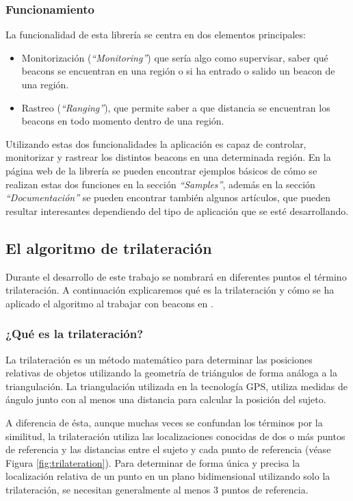 \subsubsection{Funcionamiento}

La funcionalidad de esta librería se centra en dos elementos principales: 

\begin{itemize}
\item Monitorización (\textit{``Monitoring''}) que sería algo como supervisar, saber qué beacons se encuentran en una región o si ha entrado o salido un beacon de una región.
\item Rastreo (\textit{``Ranging''}), que permite saber a que distancia se encuentran los beacons en todo momento dentro de una región.
\end{itemize}

Utilizando estas dos funcionalidades la aplicación es capaz de controlar, monitorizar y rastrear los distintos beacons en una determinada región. En la página web de la librería \cite{URL::altbeaconSamples} se pueden encontrar ejemplos básicos de cómo se realizan estas dos funciones en la sección \textit{``Samples''}, además en la sección \textit{``Documentación''} se pueden encontrar también algunos artículos, que pueden resultar interesantes dependiendo del tipo de aplicación que se esté desarrollando.


\subsection{El algoritmo de trilateración}


Durante el desarrollo de este trabajo se nombrará en diferentes puntos el término trilateración. A continuación explicaremos qué es la trilateración y cómo se ha aplicado el algoritmo al trabajar con beacons en \BulletPoint{}.

\subsubsection{¿Qué es la trilateración?}


La trilateración es un método matemático para determinar las posiciones relativas de objetos utilizando la geometría de triángulos de forma análoga a la triangulación. La triangulación utilizada en la tecnología GPS, utiliza medidas de ángulo junto con al menos una distancia para calcular la posición del sujeto. 


A diferencia de ésta, aunque muchas veces se confundan los términos por la similitud, la trilateración utiliza las localizaciones conocidas de dos o más puntos de referencia y las distancias entre el sujeto y cada punto de referencia (véase Figura \ref{fig:trilateration}). Para determinar de forma única y precisa la localización relativa de un punto en un plano bidimensional utilizando solo la trilateración, se necesitan generalmente al menos 3 puntos de referencia.

